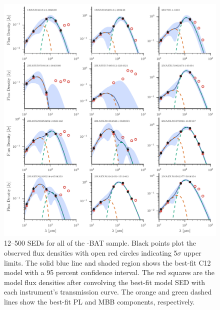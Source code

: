 \begin{figure}
\centering
\includegraphics[width=\textwidth]{figures/sedfig1}
\caption{12--500 \micron{} SEDs for all of the \herschel-BAT sample. Black points plot the observed flux densities with open red circles indicating 5$\sigma$ upper limits. The solid blue line and shaded region shows the best-fit C12 model with a 95 percent confidence interval. The red squares are the model flux densities after convolving the best-fit model SED with each instrument's transmission curve. The orange and green dashed lines show the best-fit PL and MBB components, respectively. \label{fig:seds}}
\end{figure}

